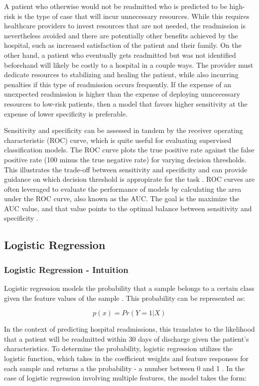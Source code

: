 \documentclass[sigconf]{acmart}
\begin{document}
A patient who otherwise would not be readmitted who is predicted to be high-risk is the type of case that will incur unnecessary resources. While this requires healthcare providers to invest resources that are not needed, the readmission is nevertheless avoided and there are potentially other benefits achieved by the hospital, such as increased satisfaction of the patient and their family. On the other hand, a patient who eventually gets readmitted but was not identified beforehand will likely be costly to a hospital in a couple ways. The provider must dedicate resources to stabilizing and healing the patient, while also incurring penalties if this type of readmission occurs frequently. If the expense of an unexpected readmission is higher than the expense of deploying unncecessary resources to low-risk patients, then a model that favors higher sensitivity at the expense of lower specificity is preferable.

Sensitivity and specificity can be assessed in tandem by the receiver operating characteristic (ROC) curve, which is quite useful for evaluating supervised classification models. The ROC curve plots the true positive rate against the false positive rate (100 minus the true negative rate) for varying decision thresholds. This illustrates the trade-off between sensitivity and specificity and can provide guidance on which decision threshold is appropirate for the task \cite{cite12}. ROC curves are often leveraged to evaluate the performance of models by calculating the area under the ROC curve, also known as the AUC. The goal is the maximize the AUC value, and that value points to the optimal balance between sensitivity and specificity \cite{cite12}.

\subsection{Logistic Regression}

\subsubsection{Logistic Regression - Intuition}

Logistic regression models the probability that a sample belongs to a certain class given the feature values of the sample \cite{cite08}. This probability can be represented as:

\[p(x) = Pr(Y = 1 | X)\]

In the context of predicting hospital readmissions, this translates to the likelihood that a patient will be readmitted within 30 days of discharge given the patient's characteristics. To determine the probability, logistic regression utilizes the logistic function, which takes in the coefficient weights and feature responses for each sample and returns a the probability - a number between 0 and 1 \cite{cite08}. In the case of logistic regression involving multiple features, the model takes the form:
\end{document}
